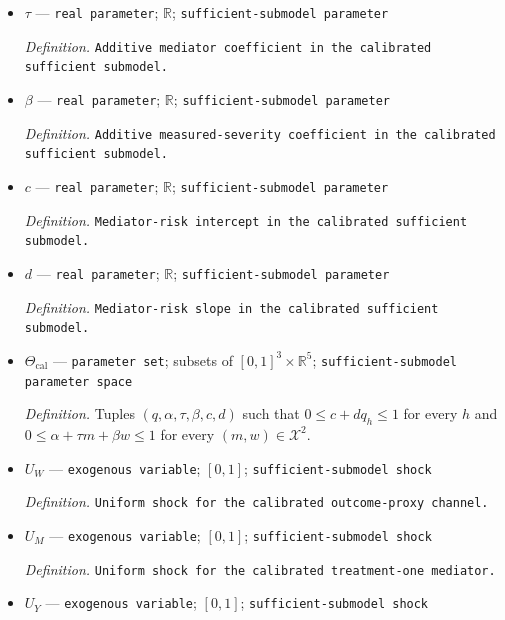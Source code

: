 \documentclass{article}
\begin{document}
\begin{itemize}
  \par\smallskip\noindent\emph{Definition.} \texttt{Outcome intercept in the calibrated sufficient submodel.}
  \item \(\tau\) --- \texttt{real parameter}; \(\mathbb R\); \texttt{sufficient-\allowbreak{}submodel parameter}
  \par\smallskip\noindent\emph{Definition.} \texttt{Additive mediator coefficient in the calibrated sufficient submodel.}
  \item \(\beta\) --- \texttt{real parameter}; \(\mathbb R\); \texttt{sufficient-\allowbreak{}submodel parameter}
  \par\smallskip\noindent\emph{Definition.} \texttt{Additive measured-\allowbreak{}severity coefficient in the calibrated sufficient submodel.}
  \item \(c\) --- \texttt{real parameter}; \(\mathbb R\); \texttt{sufficient-\allowbreak{}submodel parameter}
  \par\smallskip\noindent\emph{Definition.} \texttt{Mediator-\allowbreak{}risk intercept in the calibrated sufficient submodel.}
  \item \(d\) --- \texttt{real parameter}; \(\mathbb R\); \texttt{sufficient-\allowbreak{}submodel parameter}
  \par\smallskip\noindent\emph{Definition.} \texttt{Mediator-\allowbreak{}risk slope in the calibrated sufficient submodel.}
  \item \(\Theta_{\mathrm{cal}}\) --- \texttt{parameter set}; subsets of \([0,1]^3\times\mathbb R^5\); \texttt{sufficient-\allowbreak{}submodel parameter space}
  \par\smallskip\noindent\emph{Definition.} Tuples \((q,\alpha,\tau,\beta,c,d)\) such that \(0\le c+dq_h\le1\) for every \(h\) and \(0\le\alpha+\tau m+\beta w\le1\) for every \((m,w)\in\mathcal X^2\).
  \item \(U_W\) --- \texttt{exogenous variable}; \([0,1]\); \texttt{sufficient-\allowbreak{}submodel shock}
  \par\smallskip\noindent\emph{Definition.} \texttt{Uniform shock for the calibrated outcome-\allowbreak{}proxy channel.}
  \item \(U_M\) --- \texttt{exogenous variable}; \([0,1]\); \texttt{sufficient-\allowbreak{}submodel shock}
  \par\smallskip\noindent\emph{Definition.} \texttt{Uniform shock for the calibrated treatment-\allowbreak{}one mediator.}
  \item \(U_Y\) --- \texttt{exogenous variable}; \([0,1]\); \texttt{sufficient-\allowbreak{}submodel shock}

\end{itemize}
\end{document}
